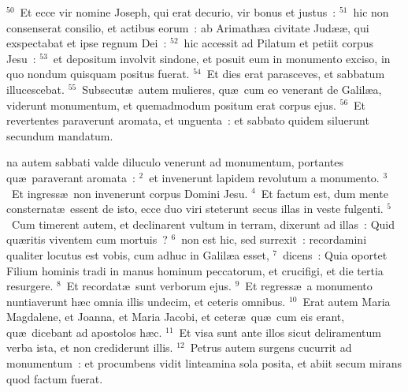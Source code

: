 ${}^{50}$~Et ecce vir nomine Joseph, qui erat decurio, vir bonus et justus~:
${}^{51}$~hic non consenserat consilio, et actibus eorum~: ab Arimath\ae a civitate Jud\ae \ae , qui exspectabat et ipse regnum Dei~:
${}^{52}$~hic accessit ad Pilatum et petiit corpus Jesu~:
${}^{53}$~et depositum involvit sindone, et posuit eum in monumento exciso, in quo nondum quisquam positus fuerat.
${}^{54}$~Et dies erat parasceves, et sabbatum illucescebat.
${}^{55}$~Subsecut\ae\ autem mulieres, qu\ae\ cum eo venerant de Galil\ae a, viderunt monumentum, et quemadmodum positum erat corpus ejus.
${}^{56}$~Et revertentes paraverunt aromata, et unguenta~: et sabbato quidem siluerunt secundum mandatum.

\bchapter
{}na autem sabbati valde diluculo venerunt ad monumentum, portantes qu\ae\ paraverant aromata~:
${}^{2}$~et invenerunt lapidem revolutum a monumento.
${}^{3}$~Et ingress\ae\ non invenerunt corpus Domini Jesu.
${}^{4}$~Et factum est, dum mente consternat\ae\ essent de isto, ecce duo viri steterunt secus illas in veste fulgenti.
${}^{5}$~Cum timerent autem, et declinarent vultum in terram, dixerunt ad illas~: Quid qu\ae ritis viventem cum mortuis~?
${}^{6}$~non est hic, sed surrexit~: recordamini qualiter locutus est vobis, cum adhuc in Galil\ae a esset,
${}^{7}$~dicens~: Quia oportet Filium hominis tradi in manus hominum peccatorum, et crucifigi, et die tertia resurgere.
${}^{8}$~Et recordat\ae\ sunt verborum ejus.
${}^{9}$~Et regress\ae\ a monumento nuntiaverunt h\ae c omnia illis undecim, et ceteris omnibus.
${}^{10}$~Erat autem Maria Magdalene, et Joanna, et Maria Jacobi, et ceter\ae\ qu\ae\ cum eis erant, qu\ae\ dicebant ad apostolos h\ae c.
${}^{11}$~Et visa sunt ante illos sicut deliramentum verba ista, et non crediderunt illis.
${}^{12}$~Petrus autem surgens cucurrit ad monumentum~: et procumbens vidit linteamina sola posita, et abiit secum mirans quod factum fuerat.


